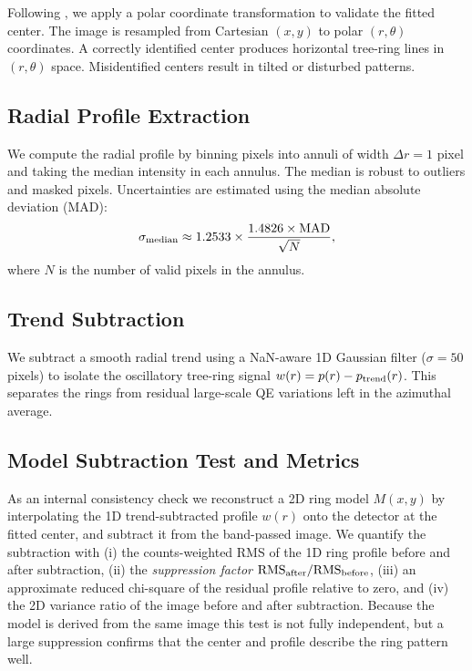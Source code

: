 Following \citet{Esteves2023}, we apply a polar coordinate transformation to validate the fitted center. The image is resampled from Cartesian $(x, y)$ to polar $(r, \theta)$ coordinates. A correctly identified center produces horizontal tree-ring lines in $(r, \theta)$ space. Misidentified centers result in tilted or disturbed patterns.

\subsection{Radial Profile Extraction}

We compute the radial profile by binning pixels into annuli of width $\Delta r = 1$ pixel and taking the median intensity in each annulus. The median is robust to outliers and masked pixels. Uncertainties are estimated using the median absolute deviation (MAD):
%
\begin{equation}
\sigma_{\rm median} \approx 1.2533 \times \frac{1.4826 \times {\rm MAD}}{\sqrt{N}},
\end{equation}
%
where $N$ is the number of valid pixels in the annulus.

\subsection{Trend Subtraction}

We subtract a smooth radial trend using a NaN-aware 1D Gaussian filter ($\sigma = 50$ pixels) to isolate the oscillatory tree-ring signal $w(r) = p(r) - p_{\rm trend}(r)$. This separates the rings from residual large-scale QE variations left in the azimuthal average.

\subsection{Model Subtraction Test and Metrics} \label{sec:subtraction}

As an internal consistency check we reconstruct a 2D ring model $M(x,y)$ by interpolating the
1D trend-subtracted profile $w(r)$ onto the detector at the fitted center, and subtract it
from the band-passed image. We quantify the subtraction with (i) the counts-weighted RMS of
the 1D ring profile before and after subtraction, (ii) the \emph{suppression factor}
${\rm RMS}_{\rm after}/{\rm RMS}_{\rm before}$, (iii) an approximate reduced chi-square of the
residual profile relative to zero, and (iv) the 2D variance ratio of the image before and
after subtraction. Because the model is derived from the same image this test is not fully
independent, but a large suppression confirms that the center and profile describe the ring
pattern well.

